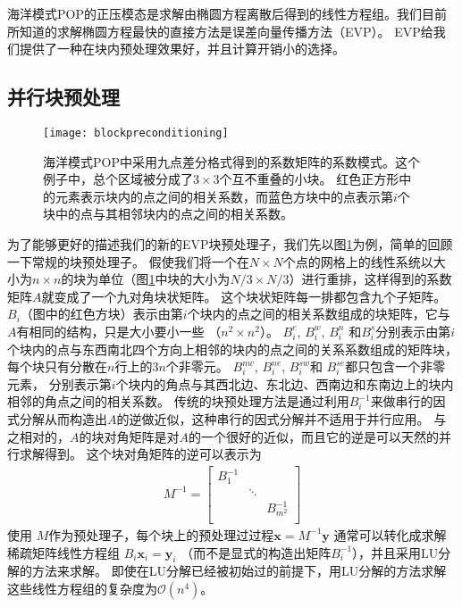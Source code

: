 海洋模式POP的正压模态是求解由椭圆方程离散后得到的线性方程组。我们目前所知道的求解椭圆方程最快的直接方法是误差向量传播方法（EVP）\cite{roache1995elliptic}。 
EVP给我们提供了一种在块内预处理效果好，并且计算开销小的选择。




\subsection{并行块预处理} 
\label{precond:EVP:Parallel}
 
\begin{figure}
\centering
\texttt{[image: blockpreconditioning]}
\caption[] {海洋模式POP中采用九点差分格式得到的系数矩阵的系数模式。这个例子中，总个区域被分成了$3\times3$个互不重叠的小块。
红色正方形中的元素表示块内的点之间的相关系数，而蓝色方块中的点表示第$i$个块中的点与其相邻块内的点之间的相关系数。 \label{fig:blockprecond}}
\end{figure}
 
为了能够更好的描述我们的新的EVP块预处理子，我们先以图\ref{fig:blockprecond}为例，简单的回顾一下常规的块预处理子。 
假使我们将一个在$N \times N$个点的网格上的线性系统以大小为$n\times n$的块为单位（图\ref{fig:blockprecond}中块的大小为$N/3\times N/3$）进行重排，这样得到的系数矩阵$A$就变成了一个九对角块状矩阵。
这个块状矩阵每一排都包含九个子矩阵。 
$B_i$（图中的红色方块）表示由第$i$个块内的点之间的相关系数组成的块矩阵，它与$A$有相同的结构，只是大小要小一些 （$n^2\times n^2$）。 
$B_i^e$, $B_i^w$, $B_i^n$ 和$B_i^s$分别表示由第$i$个块内的点与东西南北四个方向上相邻的块内的点之间的关系系数组成的矩阵块，每个块只有分散在$n$行上的$3n$个非零元。
$B_i^{nw}$, $B_i^{ne}$, $B_i^{sw}$和 $B_i^{se}$都只包含一个非零元素， 分别表示第$i$个块内的角点与其西北边、东北边、西南边和东南边上的块内相邻的角点之间的相关系数。 
传统的块预处理方法是通过利用$B_i^{-1}$来做串行的因式分解从而构造出$A$的逆做近似，这种串行的因式分解并不适用于并行应用。
与之相对的，$A$的块对角矩阵是对$A$的一个很好的近似，而且它的逆是可以天然的并行求解得到。
这个块对角矩阵的逆可以表示为 
\begin{eqnarray*}
M^{-1}=    \left [
        \begin{array}{ccccccc}
        B_1^{-1} &   &  \\
         & \ddots&  \\
        &   &  B_{m^2}^{-1} \\
    \end{array}
    \right ]
\end{eqnarray*}
使用 $M$作为预处理子，每个块上的预处理过过程$\textbf{x}
= M^{-1}\textbf{y}$ 通常可以转化成求解稀疏矩阵线性方程组 $B_i \textbf{x}_i = \textbf{y}_i$
（而不是显式的构造出矩阵$B_i^{-1}$），并且采用LU分解的方法来求解。  
即使在LU分解已经被初始过的前提下，用LU分解的方法求解这些线性方程组的复杂度为$\mathcal{O}(n^4)$\cite{golub2012matrix}。
 


